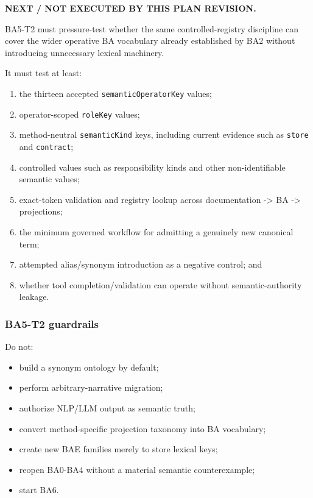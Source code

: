 \documentclass[
  10pt,
  a4paper,
]{article}
\providecommand{\tightlist}{%
  \setlength{\itemsep}{0pt}\setlength{\parskip}{0pt}}
\begin{document}
\textbf{NEXT / NOT EXECUTED BY THIS PLAN REVISION.}

BA5-T2 must pressure-test whether the same controlled-registry
discipline can cover the wider operative BA vocabulary already
established by BA2 without introducing unnecessary lexical machinery.

It must test at least:

\begin{enumerate}
\def\labelenumi{\arabic{enumi}.}
\tightlist
\item
  the thirteen accepted \texttt{semanticOperatorKey} values;
\item
  operator-scoped \texttt{roleKey} values;
\item
  method-neutral \texttt{semanticKind} keys, including current evidence
  such as \texttt{store} and \texttt{contract};
\item
  controlled values such as responsibility kinds and other
  non-identifiable semantic values;
\item
  exact-token validation and registry lookup across documentation
  -\textgreater{} BA -\textgreater{} projections;
\item
  the minimum governed workflow for admitting a genuinely new canonical
  term;
\item
  attempted alias/synonym introduction as a negative control; and
\item
  whether tool completion/validation can operate without
  semantic-authority leakage.
\end{enumerate}

\subsubsection{BA5-T2 guardrails}\label{ba5-t2-guardrails}

Do not:

\begin{itemize}
\tightlist
\item
  build a synonym ontology by default;
\item
  perform arbitrary-narrative migration;
\item
  authorize NLP/LLM output as semantic truth;
\item
  convert method-specific projection taxonomy into BA vocabulary;
\item
  create new BAE families merely to store lexical keys;
\item
  reopen BA0-BA4 without a material semantic counterexample;
\item
  start BA6.
\end{itemize}
\end{document}
